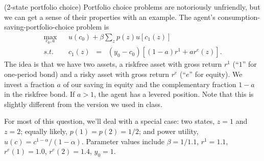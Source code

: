 \documentclass[11pt]{exam}
\begin{document}
\begin{questions}
\question (2-state portfolio choice)
Portfolio choice problems are notoriously unfriendly,
but we can get a sense of their properties with an example.
The agent's consumption-saving-portfolio-choice problem is
\begin{eqnarray*}
   \max_{c_0, a} &&  u(c_0) + \beta \sum_z p(z) u[c_1(z)] \\
        s.t. &&  c_1(z)\;\;=\;\; (y_0-c_0)[(1-a) r^1 + a r^e(z)] .
\end{eqnarray*}
The idea is that we have two assets,
a riskfree asset with gross return $r^1$ (``$1$'' for one-period bond)
and a risky asset with gross return $r^e$  (``$e$'' for equity).
We invest a fraction $a$ of our saving in equity and the complementary
fraction $1-a$ in the riskfree bond.
If $a>1$, the agent has a levered position.
Note that this is slightly different from the version we used in class.

For most of this question, we'll deal with a special case:
two states, $z=1$ and $z=2$;
equally likely, $p(1) = p(2) = 1/2$;
and power utility, $u(c) = c^{1-\alpha}/(1-\alpha)$.
Parameter values include
$\beta = 1/1.1$,
$r^1 = 1.1$,
$r^e(1) = 1.0$, $r^e(2) = 1.4$,
$ y_0 = 1$.

\end{questions}
\end{document}
